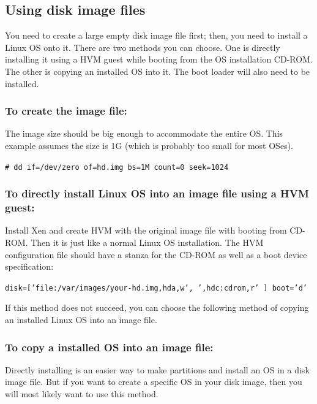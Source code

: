 \documentclass[11pt,twoside,final,openright]{report}
\begin{document}
\subsection{Using disk image files}
You need to create a large empty disk image file first; then, you need to install a Linux OS onto it. There are two methods you can choose. One is directly installing it using a HVM guest while booting from the OS installation CD-ROM. The other is copying an installed OS into it. The boot loader will also need to be installed.

\subsubsection*{To create the image file:}
The image size should be big enough to accommodate the entire OS. This example assumes the size is 1G (which is probably too small for most OSes).

{\small {\tt \# dd if=/dev/zero of=hd.img bs=1M count=0 seek=1024}}

\subsubsection*{To directly install Linux OS into an image file using a HVM guest:}

Install Xen and create HVM with the original image file with booting from CD-ROM. Then it is just like a normal Linux OS installation. The HVM configuration file should have a stanza for the CD-ROM as well as a boot device specification:

{\small {\tt disk=['file:/var/images/your-hd.img,hda,w', ',hdc:cdrom,r' ]
boot='d'}}

If this method does not succeed, you can choose the following method of copying an installed Linux OS into an image file.

\subsubsection*{To copy a installed OS into an image file:}
Directly installing is an easier way to make partitions and install an OS in a disk image file. But if you want to create a specific OS in your disk image, then you will most likely want to use this method.
\end{document}
